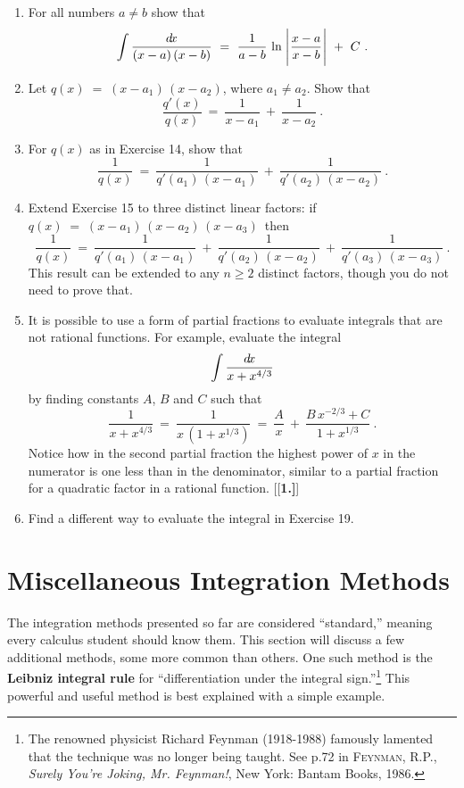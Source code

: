 {\begin{enumerate}[\bfseries 1.]
[{[\bfseries 1.]}]
\item For all numbers $a \ne b$ show that
\[
\int \frac{d\!x}{(x-a)\,(x-b)} ~=~ \frac{1}{a-b}\,\ln\;\Biggl\lvert\mspace{1mu}\frac{x-a}{x-b}\mspace{1mu}\Biggr\rvert ~+~ C ~.
\]
 \item Let $q(x) \;=\; (x-a_1)\,(x-a_2)$, where $a_1 \ne a_2$. Show that
\[
\frac{q'(x)}{q(x)} ~=~ \frac{1}{x-a_1} ~+~ \frac{1}{x-a_2} ~.
\]
 \item For $q(x)$ as in Exercise 14, show that
\[
\frac{1}{q(x)} ~=~ \frac{1}{q'(a_1)\,(x-a_1)} ~+~ \frac{1}{q'(a_2)\,(x-a_2)} ~.
\]
 \item Extend Exercise 15 to three distinct linear factors: if
  $q(x) \;=\; (x-a_1)\,(x-a_2)\,(x-a_3)\,$ then
\[
\frac{1}{q(x)} ~=~ \frac{1}{q'(a_1)\,(x-a_1)} ~+~ \frac{1}{q'(a_2)\,(x-a_2)} 
~+~ \frac{1}{q'(a_3)\,(x-a_3)}~.
\]
This result can be extended to any $n \ge 2$ distinct factors, though you do not
need to prove that.
 \item It is possible to use a form of partial fractions to evaluate integrals
 that are not rational functions. For example, evaluate the integral
\[
\int \frac{d\!x}{x + x^{4/3}}
\]
by finding constants $A$, $B$ and $C$ such that
\[
\frac{1}{x + x^{4/3}} ~=~ \frac{1}{x\,(1 + x^{1/3})} ~=~
\frac{A}{x} ~+~ \frac{B\,x^{-2/3} + C}{1 + x^{1/3}} ~.
\]
Notice how in the second partial fraction the highest power of $x$ in the
numerator is one less than in the denominator, similar to a partial fraction for
a quadratic factor in a rational function.
[{[\bfseries 1.]}]
 \item Find a different way to evaluate the integral in Exercise 19.
\end{enumerate}
}
\newpage
\section{Miscellaneous Integration Methods}
The integration methods presented so far are considered ``standard,'' meaning
every calculus student should know them. This section will discuss a few
additional methods, some more common than others. One such method is the
\textbf{Leibniz integral rule} for ``differentiation under the integral
sign.''\footnote{The renowned physicist Richard Feynman (1918-1988) famously
lamented that the technique was no longer being taught. See p.72 in
\textsc{Feynman, R.P.}, \emph{Surely You're Joking, Mr. Feynman!}, New York:
Bantam Books, 1986.} This powerful and useful method is best explained with a
simple example.

